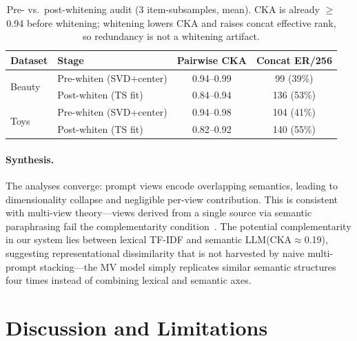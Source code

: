 \documentclass[sigconf,natbib=true,anonymous]{acmart}
\newcommand{\tfidf}{\textsc{TF-IDF}\xspace}
\newcommand{\llm}{\textsc{LLM}\xspace}
\begin{document}
\begin{table}[t]
\centering
\caption{%
Pre- vs.\ post-whitening audit (3 item-subsamples, mean).
CKA is already $\ge$0.94 before whitening; whitening lowers CKA and raises concat effective rank, so redundancy is not a whitening artifact.%
}
\label{tab:cka-prepost}
\small
\begin{tabular}{@{}llcc@{}}
\toprule
Dataset & Stage & Pairwise CKA & Concat ER/256 \\
\midrule
\multirow{2}{*}{Beauty}
 & Pre-whiten (SVD+center)  & 0.94--0.99 & 99 (39\%) \\
 & Post-whiten (TS fit)     & 0.84--0.94 & 136 (53\%) \\
\midrule
\multirow{2}{*}{Toys}
 & Pre-whiten (SVD+center)  & 0.94--0.98 & 104 (41\%) \\
 & Post-whiten (TS fit)     & 0.82--0.92 & 140 (55\%) \\
\bottomrule
\end{tabular}
\end{table}

\paragraph{Synthesis.}
The analyses converge: prompt views encode overlapping semantics, leading to dimensionality collapse and negligible per-view contribution.
This is consistent with multi-view theory---views derived from a single source via semantic paraphrasing fail the complementarity condition~\cite{xu2013multiview}.
The potential complementarity in our system lies between lexical \tfidf and semantic \llm (CKA$\approx$0.19), suggesting representational dissimilarity that is not harvested by naive multi-prompt stacking---the MV model simply replicates similar semantic structures four times instead of combining lexical and semantic axes.

\section{Discussion and Limitations}
\label{sec:discussion}
\end{document}
